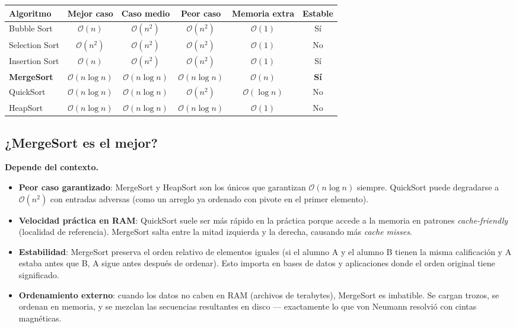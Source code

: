 \documentclass[12pt, oneside]{article}
\begin{document}
\begin{center}
\begin{tabular}{lccccc}
  \toprule
  \textbf{Algoritmo} & \textbf{Mejor caso} & \textbf{Caso medio} &
  \textbf{Peor caso} & \textbf{Memoria extra} & \textbf{Estable} \\
  \midrule
  Bubble Sort    & $\mathcal{O}(n)$       & $\mathcal{O}(n^2)$     & $\mathcal{O}(n^2)$     & $\mathcal{O}(1)$      & Sí \\
  Selection Sort & $\mathcal{O}(n^2)$     & $\mathcal{O}(n^2)$     & $\mathcal{O}(n^2)$     & $\mathcal{O}(1)$      & No \\
  Insertion Sort & $\mathcal{O}(n)$       & $\mathcal{O}(n^2)$     & $\mathcal{O}(n^2)$     & $\mathcal{O}(1)$      & Sí \\
  \textbf{MergeSort}& $\mathcal{O}(n \log n)$ & $\mathcal{O}(n \log n)$ & $\mathcal{O}(n \log n)$ & $\mathcal{O}(n)$ & \textbf{Sí} \\
  QuickSort      & $\mathcal{O}(n \log n)$ & $\mathcal{O}(n \log n)$ & $\mathcal{O}(n^2)$    & $\mathcal{O}(\log n)$ & No \\
  HeapSort       & $\mathcal{O}(n \log n)$ & $\mathcal{O}(n \log n)$ & $\mathcal{O}(n \log n)$ & $\mathcal{O}(1)$    & No \\
  \bottomrule
\end{tabular}
\end{center}

\subsection{¿MergeSort es el mejor?}

\textbf{Depende del contexto.}

\begin{itemize}
  \item \textbf{Peor caso garantizado}: MergeSort y HeapSort son los únicos que
    garantizan $\mathcal{O}(n \log n)$ siempre. QuickSort puede degradarse a
    $\mathcal{O}(n^2)$ con entradas adversas (como un arreglo ya ordenado con
    pivote en el primer elemento).

  \item \textbf{Velocidad práctica en RAM}: QuickSort suele ser más rápido en
    la práctica porque accede a la memoria en patrones \textit{cache-friendly}
    (localidad de referencia). MergeSort salta entre la mitad izquierda y la
    derecha, causando más \textit{cache misses}.

  \item \textbf{Estabilidad}: MergeSort preserva el orden relativo de elementos
    iguales (si el alumno A y el alumno B tienen la misma calificación y A estaba
    antes que B, A sigue antes después de ordenar). Esto importa en bases de datos
    y aplicaciones donde el orden original tiene significado.

  \item \textbf{Ordenamiento externo}: cuando los datos no caben en RAM (archivos
    de terabytes), MergeSort es imbatible. Se cargan trozos, se ordenan en memoria,
    y se mezclan las secuencias resultantes en disco — exactamente lo que von Neumann
    resolvió con cintas magnéticas.
\end{itemize}
\end{document}
